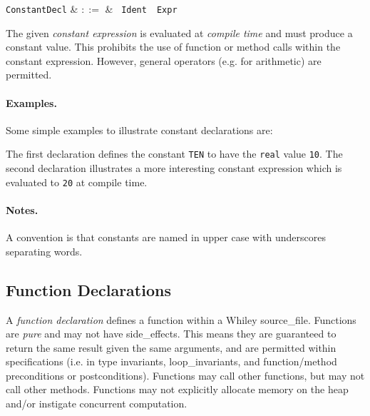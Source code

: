 \begin{syntax}
  \verb+ConstantDecl+ & $::=$ & \ \verb+Ident+\
  \ \verb+Expr+\\
\end{syntax}

The given {\em constant expression} is evaluated at {\em compile time}
and must produce a constant value.  This prohibits the use of function
or method calls within the constant expression.  However, general
operators (e.g. for arithmetic) are permitted.

\paragraph{Examples.}  Some simple examples to illustrate constant declarations are:



The first declaration defines the constant \lstinline{TEN} to have the
\lstinline{real} value \lstinline{10}.  The second
declaration illustrates a more interesting constant expression which
is evaluated to \lstinline{20} at compile time.

\paragraph{Notes.}  A convention is that constants are named in upper
case with underscores separating words.


\subsection{Function Declarations}
\label{c_source_files_function_decl}

A {\em function declaration} defines a function within a Whiley \gls{source_file}.  Functions are {\em pure} and may not have \glspl{side_effect}.  This means they are guaranteed to return the same result given the same arguments, and are permitted within specifications (i.e. in type invariants, \gls{loop_invariant}s, and function/method \gls{precondition}s or \gls{postcondition}s).  Functions may call other functions, but may not call other methods.  Functions may not explicitly allocate memory on the heap and/or instigate concurrent computation.

